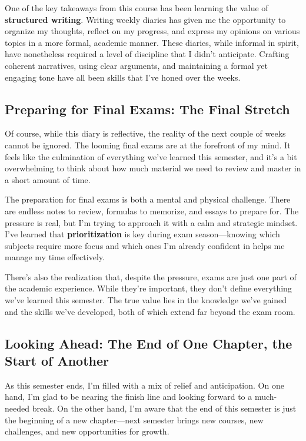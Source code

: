 \documentclass[a4paper]{article} 	%
\begin{document}
One of the key takeaways from this course has been learning the value of \textbf{structured writing}. Writing weekly diaries has given me the opportunity to organize my thoughts, reflect on my progress, and express my opinions on various topics in a more formal, academic manner. These diaries, while informal in spirit, have nonetheless required a level of discipline that I didn’t anticipate. Crafting coherent narratives, using clear arguments, and maintaining a formal yet engaging tone have all been skills that I’ve honed over the weeks.

\subsection*{Preparing for Final Exams: The Final Stretch}

Of course, while this diary is reflective, the reality of the next couple of weeks cannot be ignored. The looming final exams are at the forefront of my mind. It feels like the culmination of everything we’ve learned this semester, and it’s a bit overwhelming to think about how much material we need to review and master in a short amount of time.

The preparation for final exams is both a mental and physical challenge. There are endless notes to review, formulas to memorize, and essays to prepare for. The pressure is real, but I’m trying to approach it with a calm and strategic mindset. I’ve learned that \textbf{prioritization} is key during exam season—knowing which subjects require more focus and which ones I’m already confident in helps me manage my time effectively.

There’s also the realization that, despite the pressure, exams are just one part of the academic experience. While they’re important, they don’t define everything we’ve learned this semester. The true value lies in the knowledge we’ve gained and the skills we’ve developed, both of which extend far beyond the exam room.

\subsection*{Looking Ahead: The End of One Chapter, the Start of Another}

As this semester ends, I’m filled with a mix of relief and anticipation. On one hand, I’m glad to be nearing the finish line and looking forward to a much-needed break. On the other hand, I’m aware that the end of this semester is just the beginning of a new chapter—next semester brings new courses, new challenges, and new opportunities for growth.
\end{document}
